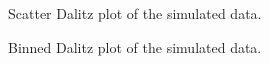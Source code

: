 \begin{multicols}{2}
    \begin{figure}[H]
    	\centering
    	\caption{Scatter Dalitz plot of the simulated data.} %
    	\label{fig:dalitz_sim}
    \end{figure}

    \begin{figure}[H]
    	\centering
    	\caption{Binned Dalitz plot of the simulated data.} %
    	\label{fig:hist2d_sim}
    \end{figure}


\end{multicols}
